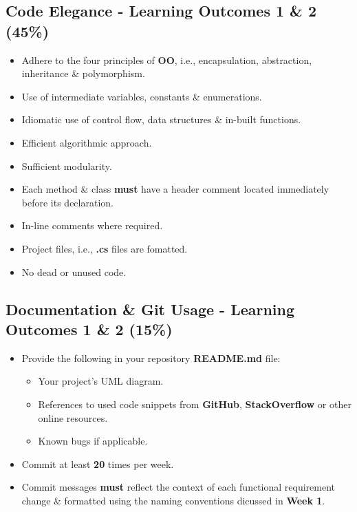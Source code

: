 \documentclass{article}
\begin{document}
\subsection*{Code Elegance - Learning Outcomes 1 \& 2  (45\%)}
\begin{itemize}
    \item Adhere to the four principles of \textbf{OO}, i.e., encapsulation, abstraction, inheritance \& polymorphism.
    \item Use of intermediate variables, constants \& enumerations.
    \item Idiomatic use of control flow, data structures \& in-built functions.
    \item Efficient algorithmic approach.
    \item Sufficient modularity.
    \item Each method \& class \textbf{must} have a header comment located immediately before its declaration.
    \item In-line comments where required. 
    \item Project files, i.e., \textbf{.cs} files are fomatted. 
    \item No dead or unused code.
\end{itemize}

\subsection*{Documentation \& Git Usage - Learning Outcomes 1 \& 2 (15\%)}
\begin{itemize}
    \item Provide the following in your repository \textbf{README.md} file:
    \begin{itemize}
        \item Your project's UML diagram.
        \item References to used code snippets from \textbf{GitHub}, \textbf{StackOverflow} or other online resources.
        \item Known bugs if applicable.
    \end{itemize}
    \item Commit at least \textbf{20} times per week.
    \item Commit messages \textbf{must} reflect the context of each functional requirement change \& formatted using the naming conventions dicussed in \textbf{Week 1}.
\end{itemize}
\end{document}
